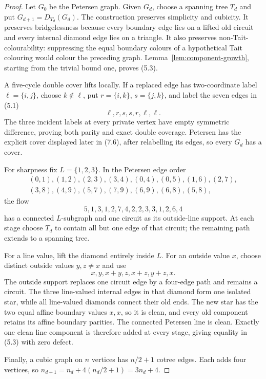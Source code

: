 \documentclass[11pt]{article}
\theoremstyle{definition}
\theoremstyle{remark}
\begin{document}
\begin{proof}
Let \(G_0\) be the Petersen graph.  Given \(G_d\), choose a spanning tree
\(T_d\) and put \(G_{d+1}=D_{T_d}(G_d)\).  The construction preserves
simplicity and cubicity.  It preserves bridgelessness because every
boundary edge lies on a lifted old circuit and every internal diamond
edge lies on a triangle.  It also preserves non-Tait-colourability:
suppressing the equal boundary colours of a hypothetical Tait colouring
would colour the preceding graph.  Lemma~\ref{lem:component-growth},
starting from the trivial bound one, proves (5.3).

A five-cycle double cover lifts locally.  If a replaced edge has
two-coordinate label \(\ell=\{i,j\}\), choose \(k\notin\ell\), put
\(r=\{i,k\}\), \(s=\{j,k\}\), and label the seven edges in (5.1)
\[
                         \ell,r,s,s,r,\ell,\ell.        \tag{5.4}
\]
The three incident labels at every private vertex have empty symmetric
difference, proving both parity and exact double coverage.  Petersen has
the explicit cover displayed later in (7.6), after relabelling its edges,
so every \(G_d\) has a cover.

For sharpness fix \(L=\{1,2,3\}\).  In the Petersen edge order
\[
\begin{gathered}
(0,1),(1,2),(2,3),(3,4),(0,4),(0,5),(1,6),(2,7),\\
(3,8),(4,9),(5,7),(7,9),(6,9),(6,8),(5,8),
\end{gathered}
\]
the flow
\[
              5,1,3,1,2,7,4,2,2,3,3,1,2,6,4          \tag{5.5}
\]
has a connected \(L\)-subgraph and one circuit as its outside-line
support.  At each stage choose \(T_d\) to contain all but one edge of
that circuit; the remaining path extends to a spanning tree.

For a line value, lift the diamond entirely inside \(L\).  For an outside
value \(x\), choose distinct outside values \(y,z\ne x\) and use
\[
                         x,y,x+y,z,x+z,y+z,x.           \tag{5.6}
\]
The outside support replaces one circuit edge by a four-edge path and
remains a circuit.  The three line-valued internal edges in that diamond
form one isolated star, while all line-valued diamonds connect their old
ends.  The new star has the two equal affine boundary values \(x,x\), so
it is clean, and every old component retains its affine boundary parities.
The connected Petersen line is clean.  Exactly one clean line component
is therefore added at every stage, giving equality in (5.3) with zero
defect.

Finally, a cubic graph on \(n\) vertices has \(n/2+1\) cotree edges.
Each adds four vertices, so \(n_{d+1}=n_d+4(n_d/2+1)=3n_d+4\).
\end{proof}
\end{document}
